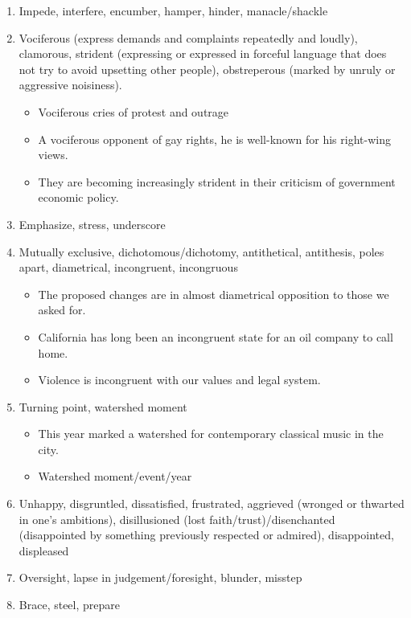 \documentclass[oneside]{book}
\begin{document}
\begin{enumerate}
\begin{itemize}
    \end{itemize}
    \item Impede, interfere, encumber, hamper, hinder, manacle/shackle
    \item Vociferous (express demands and complaints repeatedly and loudly), clamorous, strident (expressing or expressed in forceful language that does not try to avoid upsetting other people), obstreperous (marked by unruly or aggressive noisiness).
    \begin{itemize}
        \item Vociferous cries of protest and outrage 
        \item A vociferous opponent of gay rights, he is well-known for his right-wing views.
        \item They are becoming increasingly strident in their criticism of government economic policy.
    \end{itemize}
    \item Emphasize, stress, underscore
    \item Mutually exclusive, dichotomous/dichotomy, antithetical, antithesis, poles apart, diametrical, incongruent, incongruous
    \begin{itemize}
        \item The proposed changes are in almost diametrical opposition to those we asked for.
        \item California has long been an incongruent state for an oil company to call home.
        \item Violence is incongruent with our values and legal system.
    \end{itemize}
    \item Turning point, watershed moment
    \begin{itemize}
        \item This year marked a watershed for contemporary classical music in the city.
        \item Watershed moment/event/year
    \end{itemize}
    \item Unhappy, disgruntled, dissatisfied, frustrated, aggrieved (wronged or thwarted in one's ambitions), disillusioned (lost faith/trust)/disenchanted (disappointed by something previously respected or admired), disappointed, displeased
    \item Oversight, lapse in judgement/foresight, blunder, misstep 
    \item Brace, steel, prepare
\end{enumerate}
\end{document}

